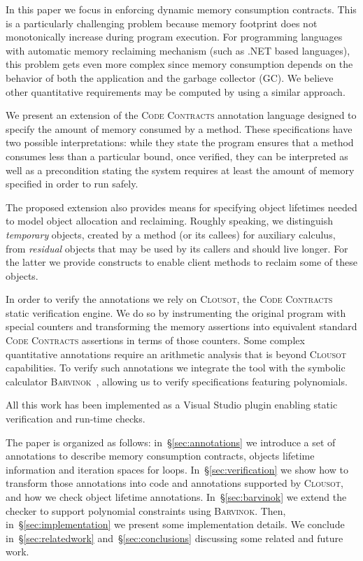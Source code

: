 In this paper we focus in enforcing dynamic memory consumption contracts. 
This is a particularly challenging problem because memory footprint does not monotonically increase during program execution. For programming languages with automatic memory reclaiming mechanism (such as .NET based languages), this problem gets even more complex since memory consumption depends on the behavior of both the application and the garbage collector (GC). 
We believe other quantitative requirements may be computed by using a similar approach. 

We present an extension of the \textsc{Code Contracts} annotation language designed to specify the amount of memory consumed by a method. These specifications have two possible interpretations:  while they state the program ensures that a method consumes less than a particular bound, once verified, they can be interpreted as well as a precondition stating the system requires at least the amount of memory specified in order to run safely.

The proposed extension also provides means  for specifying object lifetimes needed to model object allocation and reclaiming. Roughly speaking, we distinguish \emph{temporary} objects, created by a method (or its callees) for auxiliary calculus, 
from \emph{residual} objects that may be used by its callers and should live longer. For the latter we provide constructs to enable client methods to reclaim some of these objects.

In order to verify the annotations we rely on \textsc{Clousot}, the \textsc{Code Contracts} static verification engine. We do so by instrumenting the original program with special counters and transforming the memory assertions into equivalent standard \textsc{Code Contracts}  assertions in terms of those counters.
Some complex quantitative annotations require an arithmetic analysis that is beyond \textsc{Clousot} capabilities. To verify such  annotations we integrate the tool with the symbolic calculator \textsc{Barvinok}~\cite{clauss2009symbolic}, allowing us to verify specifications featuring polynomials.

All this work has been implemented as a Visual Studio plugin enabling static verification and run-time checks.

The paper is organized as follows: in~\S\ref{sec:annotations} we introduce a set of annotations to describe memory consumption  contracts,  objects lifetime information and iteration spaces for loops. In~\S\ref{sec:verification} we show how to transform those annotations into code and annotations supported by \textsc{Clousot}, and how we check object lifetime annotations.
In~\S\ref{sec:barvinok} we extend the checker to support polynomial constraints using \textsc{Barvinok}.
Then, in~\S\ref{sec:implementation} we present some implementation details. We conclude in~\S\ref{sec:relatedwork} and~\S\ref{sec:conclusions} discussing some related and future work.